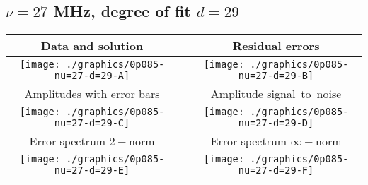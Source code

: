 

% 

\clearpage{}
\break{}

\subsection{$\nu = 27$ MHz, degree of fit $d = 29$}

\begin{table}[h]
    \begin{center}
        \begin{tabular}{ccc}
            Data and solution & \quad & Residual errors \\\hline
            \texttt{[image: ./graphics/0p085-nu=27-d=29-A]} &&
            \texttt{[image: ./graphics/0p085-nu=27-d=29-B]} \\[15pt]
            Amplitudes with error bars && Amplitude signal--to--noise \\\hline
            \texttt{[image: ./graphics/0p085-nu=27-d=29-C]} &&
            \texttt{[image: ./graphics/0p085-nu=27-d=29-D]} \\[15pt]
            Error spectrum $2-$norm && Error spectrum $\infty-$norm \\\hline
            \texttt{[image: ./graphics/0p085-nu=27-d=29-E]} &&
            \texttt{[image: ./graphics/0p085-nu=27-d=29-F]} \\[15pt]
        \end{tabular}
    \end{center}
\label{fig:elev=85, nu=27}
\end{table}



\endinput
